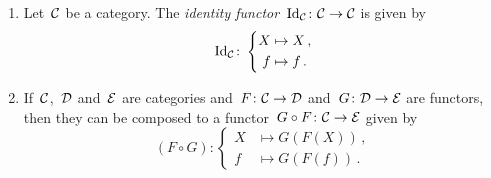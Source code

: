 \begin{remark}
  \leavevmode
  \begin{enumerate}
    \item
      Let~$\mathcal{C}$ be a category.
      The \emph{identity functor}~$\mathrm{Id}_{\mathcal{C}} \colon \mathcal{C} \to \mathcal{C}$ is given by
      \[
                \mathrm{Id}_{\mathcal{C}}
        \colon  \left\{
                  \begin{aligned}
                    X &\mapsto  X \,, \\
                    f &\mapsto  f \,.
                  \end{aligned}
                \right.
      \]
    \item
      If~$\mathcal{C}$,~$\mathcal{D}$ and~$\mathcal{E}$ are categories and~$F \colon \mathcal{C} \to \mathcal{D}$ and~$G \colon \mathcal{D} \to \mathcal{E}$ are functors, then they can be composed to a functor~$G \circ F \colon \mathcal{C} \to \mathcal{E}$ given by
      \[
                (F \circ G)
        \colon  \left\{
                  \begin{aligned}
                    X &\mapsto  G(F(X)) \,, \\
                    f &\mapsto  G(F(f)) \,.
                  \end{aligned}
                \right.
      \]
  \end{enumerate}
\end{remark}


